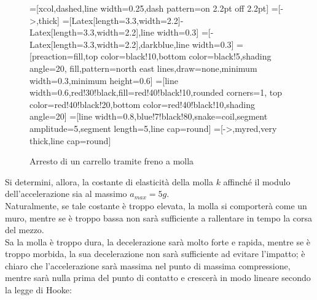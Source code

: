 \documentclass[a4paper]{extarticle}
\begin{document}
\begin{figure}[H]
  \centering
  =[xcol,dashed,line width=0.25,dash pattern=on 2.2pt off 2.2pt]
  =[->,thick] %
  =[{Latex[length=3.3,width=2.2]}-{Latex[length=3.3,width=2.2]},line width=0.3]
  =[-{Latex[length=3.3,width=2.2]},darkblue,line width=0.3]
  =[preaction={fill,top color=black!10,bottom color=black!5,shading angle=20},
                      fill,pattern=north east lines,draw=none,minimum width=0.3,minimum height=0.6]
  =[line width=0.6,red!30!black,fill=red!40!black!10,rounded corners=1,
                    top color=red!40!black!20,bottom color=red!40!black!10,shading angle=20]
  =[line width=0.8,blue!7!black!80,snake=coil,segment amplitude=5,segment length=5,line cap=round]
  \tikzset{>=latex} %
  =[->,myred,very thick,line cap=round]
  \def\tick#1#2{\draw[thick] (#1)++(#2:0.1) --++ (#2-180:0.2)}

  \caption{Arresto di un carrello tramite freno a molla}
  \label{fig:arresto_carrello_freno_molla}
\end{figure}

\noindent
Si determini, allora, la costante di elasticità della molla $k$ affinché il modulo dell'accelerazione sia al massimo $a_{max}=5g$.\\
Naturalmente, se tale costante è troppo elevata, la molla si comporterà come un muro, mentre se è troppo bassa non sarà sufficiente a rallentare in tempo la corsa del mezzo.\\
Sa la molla è troppo dura, la decelerazione sarà molto forte e rapida, mentre se è troppo morbida, la sua decelerazione non sarà sufficiente ad evitare l'impatto; è chiaro che l'accelerazione sarà massima nel punto di massima compressione, mentre sarà nulla prima del punto di contatto e crescerà in modo lineare secondo la legge di Hooke:
\end{document}
